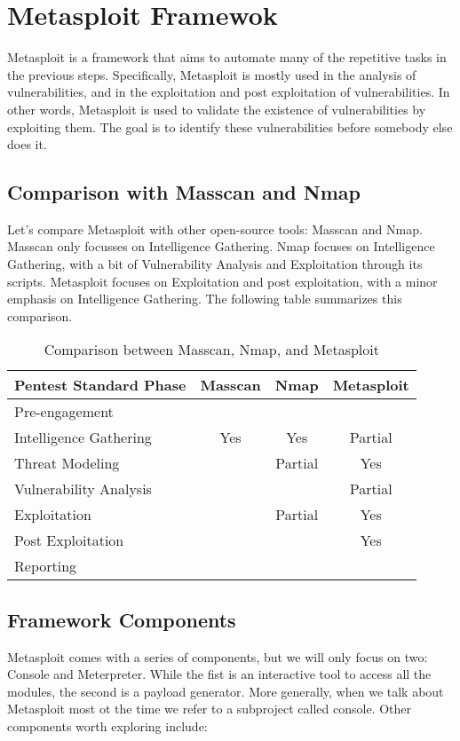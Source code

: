 \section{Metasploit Framewok}

Metasploit is a framework that aims to automate many of the repetitive tasks in the previous steps. Specifically, Metasploit is mostly used in the analysis of vulnerabilities, and in the exploitation and post exploitation of vulnerabilities. In other words, Metasploit is used to validate the existence of vulnerabilities by exploiting them. The goal is to identify these vulnerabilities before somebody else does it.

\subsection{Comparison with Masscan and Nmap}

Let's compare Metasploit with other open-source tools: Masscan and Nmap. Masscan only focusses on Intelligence Gathering. Nmap focuses on Intelligence Gathering, with a bit of Vulnerability Analysis and Exploitation through its scripts. Metasploit focuses on Exploitation and post exploitation, with a minor emphasis on Intelligence Gathering. The following table summarizes this comparison.

\begin{table}[h!]
    \centering
    \begin{tabular}{|l|c|c|c|} 
        \hline
        Pentest Standard Phase & Masscan & Nmap & Metasploit \\ [0.5ex] 
        \hline\hline
        Pre-engagement & & & \\
        Intelligence Gathering & Yes & Yes & Partial \\
        Threat Modeling & & Partial & Yes \\
        Vulnerability Analysis &  &  & Partial \\
        Exploitation & & Partial & Yes \\
        Post Exploitation & & & Yes \\
        Reporting & & & \\
        \hline
    \end{tabular}
    \caption{Comparison between Masscan, Nmap, and Metasploit}
\end{table}

\subsection{Framework Components}
Metasploit comes with a series of components, but we will only focus on two: Console and Meterpreter. While the fist is an interactive tool to access all the modules, the second is a payload generator. More generally, when we talk about Metasploit most ot the time we refer to a subproject called console. Other components worth exploring include:

